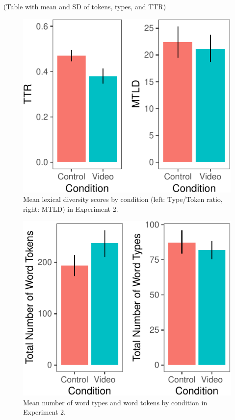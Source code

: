 \documentclass[10pt, letterpaper]{article}
\newenvironment{CodeChunk}{}{}
\begin{document}
(Table with mean and SD of tokens, types, and TTR)

\begin{CodeChunk}
\begin{figure}[H]

{\centering \includegraphics{figs/e2lexdiv-1} 

}

\caption[Mean lexical diversity scores by condition (left]{Mean lexical diversity scores by condition (left: Type/Token ratio, right: MTLD) in Experiment 2.}\label{fig:e2lexdiv}
\end{figure}
\end{CodeChunk}

\begin{CodeChunk}
\begin{figure}[H]

{\centering \includegraphics{figs/e2token-type-1} 

}

\caption[Mean number of word types and word tokens by condition in Experiment 2]{Mean number of word types and word tokens by condition in Experiment 2.}\label{fig:e2token-type}
\end{figure}
\end{CodeChunk}
\end{document}
